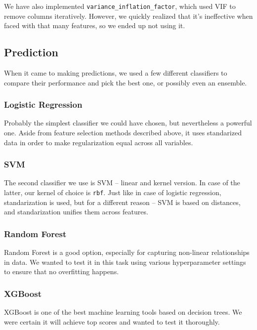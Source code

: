 \documentclass{article}
\begin{document}
We have also implemented \verb|variance_inflation_factor|, which used VIF to remove columns iteratively. However, we quickly realized that it's ineffective when faced with that many features, so we ended up not using it.

\subsection{Prediction}

When it came to making predictions, we used a few different classifiers to compare their performance and pick the best one, or possibly even an ensemble.

\subsubsection{Logistic Regression}

Probably the simplest classifier we could have chosen, but nevertheless a powerful one. Aside from feature selection methods described above, it uses standarized data in order to make regularization equal across all variables.

\subsubsection{SVM}

The second classifier we use is SVM -- linear and kernel version. In case of the latter, our kernel of choice is \verb|rbf|. Just like in case of logistic regression, standarization is used, but for a different reason -- SVM is based on distances, and standarization unifies them across features.

\subsubsection{Random Forest}

Random Forest is a good option, especially for capturing non-linear relationships in data. We wanted to test it in this task using various hyperparameter settings to ensure that no overfitting happens.

\subsubsection{XGBoost}

XGBoost is one of the best machine learning tools based on decision trees. We were certain it will achieve top scores and wanted to test it thoroughly. 
\end{document}
